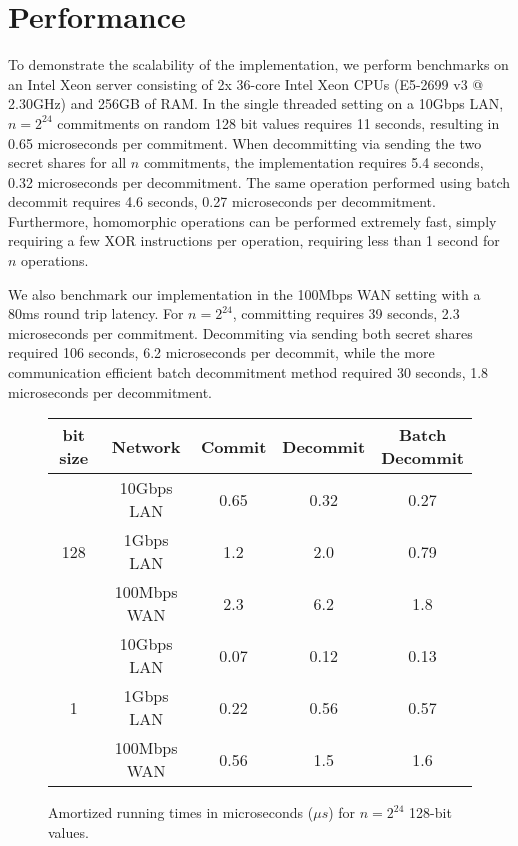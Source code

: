 
\section{Performance}
To demonstrate the scalability of the implementation, we perform benchmarks on an Intel Xeon server consisting of 2x 36-core Intel Xeon CPUs (E5-2699 v3 @ 2.30GHz) and 256GB of RAM. In the single threaded setting on a 10Gbps LAN, $n=2^{24}$ commitments on random 128 bit values requires 11 seconds, resulting in 0.65 microseconds per commitment. When decommitting via sending the two secret shares for all $n$ commitments, the implementation requires 5.4 seconds, 0.32 microseconds per decommitment. The same operation performed using batch decommit requires 4.6 seconds, 0.27 microseconds per decommitment. Furthermore, homomorphic operations can be performed extremely fast, simply requiring  a few XOR instructions per operation, requiring less than 1 second for $n$ operations.

We also benchmark our implementation in the 100Mbps WAN setting with a 80ms round trip latency. For $n=2^{24}$, committing  requires 39 seconds, 2.3 microseconds per commitment. Decommiting via sending both secret shares required 106 seconds, 6.2 microseconds per decommit, while the more communication efficient batch decommitment method required 30 seconds, 1.8 microseconds per decommitment.

\begin{figure}
\begin{center}
  \small
  \begin{tabular}{|c|c|c|c|c|}
  	\hline
  	      bit size       &   Network   & Commit & Decommit & \shortstack{Batch \\Decommit} \\ \hline
  	\multirow{3}{*}{128} & 10Gbps LAN  &  0.65  &   0.32   &             0.27              \\
  	                     &  1Gbps LAN  &  1.2   &   2.0    &             0.79              \\
  	                     & 100Mbps WAN &  2.3   &   6.2    &              1.8              \\ \hline
  	 \multirow{3}{*}{1}  & 10Gbps LAN  &  0.07  &   0.12   &             0.13              \\
  	                     &  1Gbps LAN  &  0.22  &   0.56   &             0.57              \\
  	                     & 100Mbps WAN &  0.56  &   1.5    &              1.6              \\ \hline
  \end{tabular}
  \caption{Amortized running times in microseconds ($\mu s$) for $n = 2^{24}$ 128-bit values.}
  \end{center}
\end{figure}

